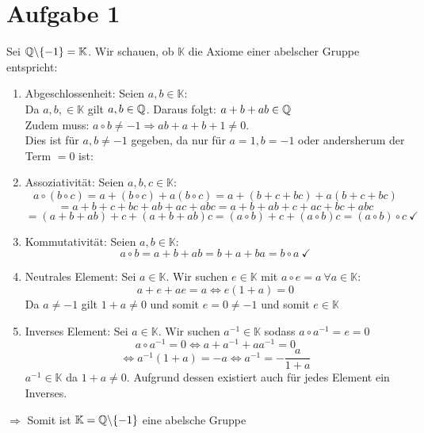 \section{Aufgabe 1}
    Sei  $\mathbb{Q}\backslash \{-1\} = \mathbb{K}$. Wir schauen, ob $\mathbb{K}$ die Axiome einer abelscher Gruppe entspricht:
    \begin{enumerate}[label=(\roman*)]
        \item Abgeschlossenheit: Seien $a,b \in \mathbb{K}$:    \\
            Da $a,b, \in \mathbb{K}$ gilt $a,b \in \mathbb{Q}$. Daraus folgt: $a+b+ab \in \mathbb{Q}$\\
            Zudem muss: $a\circ b \neq -1 \Rightarrow ab+a+b+1\neq 0$. \\
            Dies ist für $a,b \neq -1$ gegeben, da nur für $a=1,b=-1$ oder andersherum der Term $=0$ ist: \checkmark
        \item Assoziativität: Seien $a,b,c \in \mathbb{K}$: 
            $$a\circ (b \circ c) = a+(b\circ c)+a(b\circ c) = a+(b+c+bc)+a(b+c+bc)$$
            $$=a+b+c+bc+ab+ac+abc=a+b+ab+c+ac+bc+abc$$
            $$=(a+b+ab)+c+(a+b+ab)c=(a\circ b)+c+(a\circ b)c=(a\circ b)\circ c\ \checkmark$$ 
        \item Kommutativität: Seien $a,b \in \mathbb{K}$: 
            $$a\circ b = a+b+ab=b+a+ba=b\circ a\ \checkmark$$
         \item Neutrales Element: Sei $a \in \mathbb{K}$. Wir suchen $e \in \mathbb{K}$ mit     $a\circ e = a \ \forall a \in \mathbb{K}$:
            $$a+e+ae=a \Leftrightarrow e(1+a) = 0$$
            Da $a\neq -1$ gilt $1+a \neq 0$ und somit $e=0\neq -1$ und somit $e \in \mathbb{K}$ \checkmark
         \item Inverses Element: Sei $a \in \mathbb{K}$. Wir suchen $a^{-1} \in \mathbb{K}$ sodass $a \circ a^{-1} = e = 0$
            $$a \circ a^{-1} = 0  \Leftrightarrow a+a^{-1}+aa^{-1}=0$$
            $$\Leftrightarrow a^{-1}(1+a)=-a\Leftrightarrow a^{-1}= -\frac{a}{1+a}$$
            $a^{-1} \in \mathbb{K}$ da $1+a \neq 0$. Aufgrund dessen existiert auch für jedes Element ein Inverses. \checkmark
    \end{enumerate}
    $\Rightarrow$ Somit ist $\mathbb{K} = \mathbb{Q}\backslash \{-1\}$ eine abelsche Gruppe
            